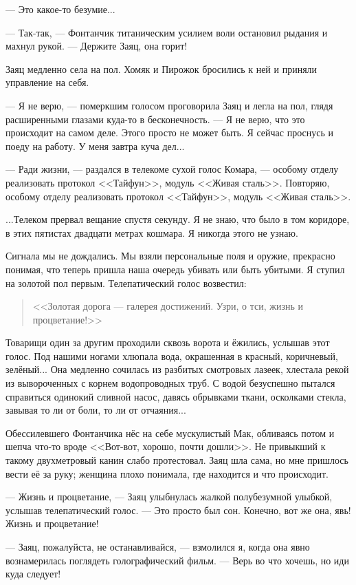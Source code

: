 --- Это какое-то безумие...

--- Так-так, --- Фонтанчик титаническим усилием воли остановил рыдания и махнул рукой.
--- Держите Заяц, она горит!

Заяц медленно села на пол.
Хомяк и Пирожок бросились к ней и приняли управление на себя.

--- Я не верю, --- померкшим голосом проговорила Заяц и легла на пол, глядя расширенными глазами куда-то в бесконечность.
--- Я не верю, что это происходит на самом деле.
Этого просто не может быть.
Я сейчас проснусь и поеду на работу.
У меня завтра куча дел...

--- Ради жизни, --- раздался в телекоме сухой голос Комара, --- особому отделу реализовать протокол <<Тайфун>>, модуль <<Живая сталь>>.
Повторяю, особому отделу реализовать протокол <<Тайфун>>, модуль <<Живая сталь>>.

...Телеком прервал вещание спустя секунду.
Я не знаю, что было в том коридоре, в этих пятистах двадцати метрах кошмара.
Я никогда этого не узнаю.

Сигнала мы не дождались.
Мы взяли персональные поля и оружие, прекрасно понимая, что теперь пришла наша очередь убивать или быть убитыми.
Я ступил на золотой пол первым.
Телепатический голос возвестил:

\begin{quote}
<<Золотая дорога --- галерея достижений.
Узри, о тси, жизнь и процветание!>>
\end{quote}

Товарищи один за другим проходили сквозь ворота и ёжились, услышав этот голос.
Под нашими ногами хлюпала вода, окрашенная в красный, коричневый, зелёный...
Она медленно сочилась из разбитых смотровых лазеек, хлестала рекой из вывороченных с корнем водопроводных труб.
С водой безуспешно пытался справиться одинокий сливной насос, давясь обрывками ткани, осколками стекла, завывая то ли от боли, то ли от отчаяния...

Обессилевшего Фонтанчика нёс на себе мускулистый Мак, обливаясь потом и шепча что-то вроде <<Вот-вот, хорошо, почти дошли>>.
Не привыкший к такому двухметровый канин слабо протестовал.
Заяц шла сама, но мне пришлось вести её за руку;
женщина плохо понимала, где находится и что происходит.

--- Жизнь и процветание, --- Заяц улыбнулась жалкой полубезумной улыбкой, услышав телепатический голос.
--- Это просто был сон.
Конечно, вот же она, явь!
Жизнь и процветание!

--- Заяц, пожалуйста, не останавливайся, --- взмолился я, когда она явно вознамерилась поглядеть голографический фильм.
--- Верь во что хочешь, но иди куда следует!

